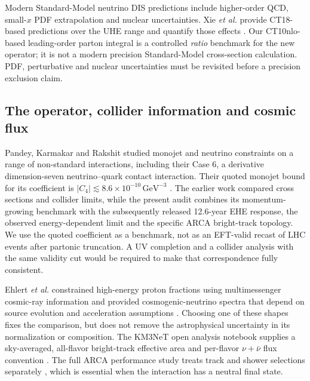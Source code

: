 \documentclass[11pt,a4paper]{article}
\begin{document}
Modern Standard-Model neutrino DIS predictions include higher-order QCD,
small-$x$ PDF extrapolation and nuclear uncertainties.  Xie \emph{et al.}
provide CT18-based predictions over the UHE range and quantify those effects
\cite{Xie:2024}.  Our CT10nlo-based leading-order parton integral is a
controlled \emph{ratio} benchmark for the new operator; it is not a modern
precision Standard-Model cross-section calculation.  PDF, perturbative and
nuclear uncertainties must be revisited before a precision exclusion claim.

\subsection{The operator, collider information and cosmic flux}
Pandey, Karmakar and Rakshit studied monojet and neutrino constraints on a
range of non-standard interactions, including their Case 6, a derivative
dimension-seven neutrino--quark contact interaction.  Their quoted monojet
bound for its coefficient is
$|C_4|\lesssim 8.6\times10^{-10}\,\mathrm{GeV}^{-3}$
\cite{Pandey:2019}.  The earlier work compared cross sections and collider
limits, while the present audit combines its momentum-growing benchmark
with the subsequently released 12.6-year EHE response, the observed
energy-dependent limit and the specific ARCA bright-track topology.  We use
the quoted coefficient as a benchmark, not as an EFT-valid recast of LHC
events after partonic truncation.  A UV completion and a collider analysis
with the same validity cut would be required to make that correspondence
fully consistent.

Ehlert \emph{et al.} constrained high-energy proton fractions using
multimessenger cosmic-ray information and provided cosmogenic-neutrino
spectra that depend on source evolution and acceleration assumptions
\cite{Ehlert:2024}.  Choosing one of these shapes fixes the comparison, but
does not remove the astrophysical uncertainty in its normalization or
composition.  The KM3NeT open analysis notebook supplies a sky-averaged,
all-flavor bright-track effective area and per-flavor $\nu+\bar\nu$ flux
convention \cite{KM3NeT:2025Data}.  The full ARCA performance study treats
track and shower selections separately \cite{KM3NeT:2024ARCA}, which is
essential when the interaction has a neutral final state.
\end{document}
